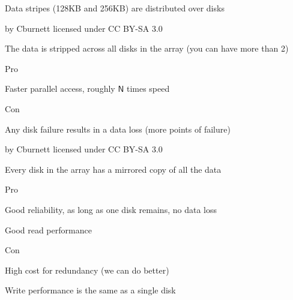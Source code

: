\begin{slide}
  

  Data stripes (128KB and 256KB) are distributed over disks

  \begin{center}
    
  \end{center}
  
  \begin{flushright}
    by Cburnett licensed under CC BY-SA 3.0
  \end{flushright}

\end{slide}

\begin{slide}
  

  The data is stripped across all disks in the array (you can have more than 2)
  \medskip

  Pro

  \leftspace{}Faster parallel access, roughly $\mathsf{N}$ times speed
  \medskip

  Con

  \leftspace{}Any disk failure results in a data loss (more points of failure)

\end{slide}

\begin{slide}
  

  \begin{center}
    
  \end{center}

  \begin{flushright}
    by Cburnett licensed under CC BY-SA 3.0
  \end{flushright}
\end{slide}

\begin{slide}
  

  Every disk in the array has a mirrored copy of all the data
  \medskip

  Pro

  \leftspace{}Good reliability, as long as one disk remains, no data loss

  \leftspace{}Good read performance
  \medskip

  Con

  \leftspace{}High cost for redundancy (we can do better)

  \leftspace{}Write performance is the same as a single disk

\end{slide}

